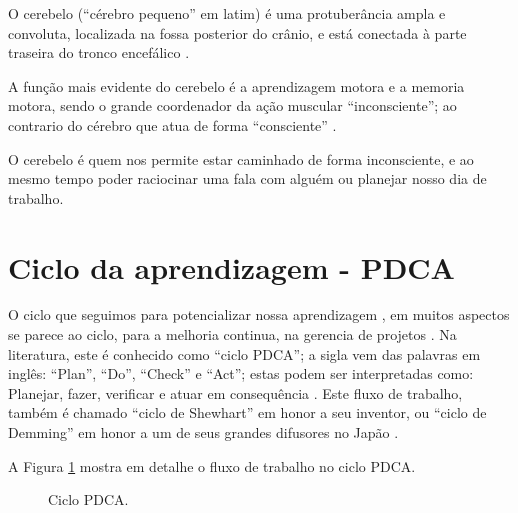 \begin{elaboracion}[title=O cerebelo e o comportamento inconsciente, width= 1.00\linewidth]
O cerebelo (``cérebro pequeno'' em latim) é uma protuberância ampla e convoluta,
localizada na fossa posterior do crânio, 
e está conectada à parte traseira do tronco encefálico \cite[pp. 93]{gazzanigaciencia} \cite[pp. 87]{carneiro2004atlas}
\cite[pp. 516]{bearneurociencias}.

A função mais evidente do cerebelo é a aprendizagem motora e a memoria motora,
sendo o grande coordenador da ação muscular ``inconsciente'';
ao contrario do cérebro que atua de forma ``consciente'' 
\cite[pp. 93]{gazzanigaciencia} \cite[pp. 87]{carneiro2004atlas} \cite[pp. 516]{bearneurociencias}.

O cerebelo é quem nos permite estar caminhado de forma inconsciente,
e ao mesmo tempo poder raciocinar uma fala com alguém ou planejar nosso dia de trabalho.
\end{elaboracion}



\section{Ciclo da aprendizagem - PDCA}
\label{sec:cicloaprendizagem}
O ciclo que seguimos para potencializar nossa aprendizagem \cite[pp. 13]{mumford2001aprendendo},
em muitos aspectos se parece ao ciclo, para a melhoria continua, na gerencia de projetos 
\cite[pp. 4]{caloba2018gerenciamento} \cite[pp. 59]{teixeira2018gestao}.
Na literatura, este é conhecido como ``ciclo PDCA'';
a sigla vem das palavras em inglês: ``Plan'', ``Do'', ``Check'' e ``Act'';
estas podem ser interpretadas como: Planejar, fazer, verificar e atuar em consequência
\cite[pp. 59]{teixeira2018gestao} \cite[pp. 4]{caloba2018gerenciamento}.
Este fluxo de trabalho, também é chamado ``ciclo de Shewhart'' em honor a seu inventor,
ou ``ciclo de Demming'' em honor a um de seus grandes difusores no Japão
\cite[pp. 59]{teixeira2018gestao} \cite[pp. 4]{caloba2018gerenciamento}.

A Figura \ref{fig:ciclopdca} mostra em detalhe o fluxo de trabalho no ciclo PDCA.
\begin{figure}[!h]
  \centering
{}
\caption{Ciclo PDCA.}
\label{fig:ciclopdca}
\end{figure}

